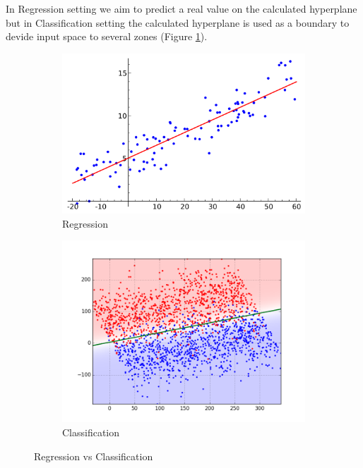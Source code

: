 \documentclass[12pt]{article}
\begin{document}
In Regression setting we aim to predict a real value on the calculated hyperplane but in Classification setting the calculated hyperplane is used as a boundary to devide input space to several zones (Figure \ref{fig:reg_clas}).
\begin{figure}[h!]
  \centering
  \begin{subfigure}[b]{0.4\linewidth}
    \includegraphics[width=\linewidth]{./images/regression.png}
    \caption{Regression}
  \end{subfigure} 
  \begin{subfigure}[b]{0.4\linewidth}
    \includegraphics[width=\linewidth]{./images/classification.png}
    \caption{Classification}
  \end{subfigure}
  \caption{Regression vs Classification}
  \label{fig:reg_clas}
\end{figure}
\end{document}
